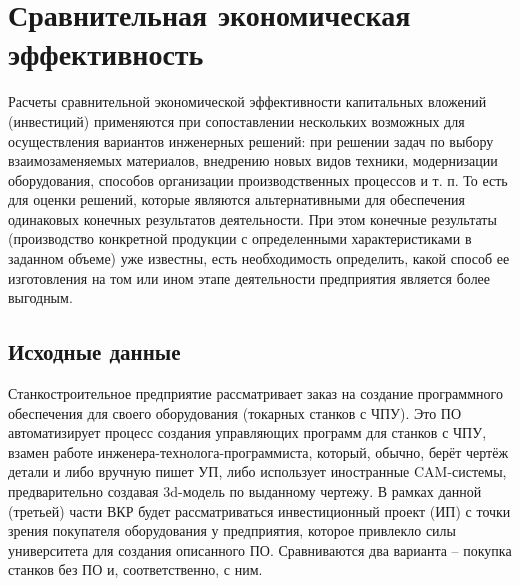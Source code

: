 %
%
%
%












\section{Сравнительная экономическая эффективность}

Расчеты сравнительной экономической эффективности капитальных вложений (инвестиций) применяются при сопоставлении нескольких возможных для осуществления вариантов инженерных решений: при решении задач по выбору взаимозаменяемых материалов, внедрению новых видов техники, модернизации оборудования, способов организации производственных процессов и т. п. То есть для оценки решений, которые являются альтернативными для обеспечения одинаковых конечных результатов деятельности. При этом конечные результаты (производство конкретной продукции с определенными характеристиками в заданном объеме) уже известны, есть необходимость определить, какой способ ее изготовления на том или ином этапе деятельности предприятия является более выгодным.

\subsection{Исходные данные}

Станкостроительное предприятие рассматривает заказ на создание программного обеспечения для своего оборудования (токарных станков с ЧПУ). Это ПО автоматизирует процесс создания управляющих программ для станков с ЧПУ, взамен работе инженера-технолога-программиста, который, обычно, берёт чертёж детали и либо вручную пишет УП, либо использует иностранные CAM-системы, предварительно создавая 3d-модель по выданному чертежу.
В рамках данной (третьей) части ВКР будет рассматриваться инвестиционный проект (ИП) с точки зрения покупателя оборудования у предприятия, которое привлекло силы университета для создания описанного ПО. Сравниваются два варианта – покупка станков без ПО и, соответственно, с ним.

